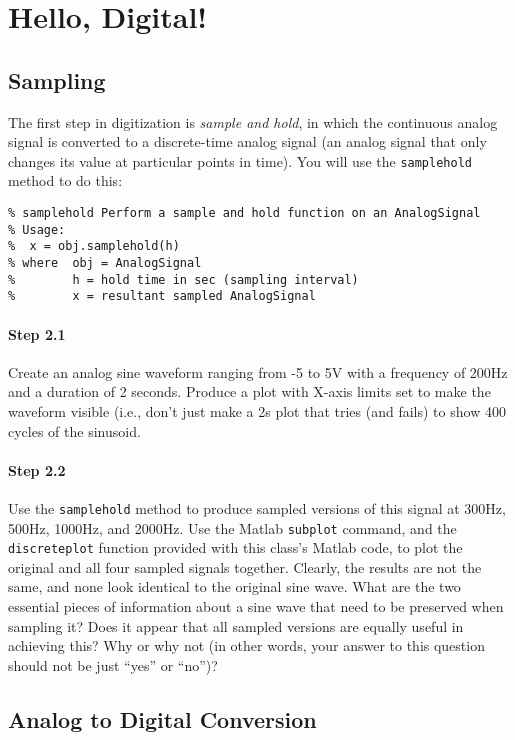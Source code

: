 
\section{Hello, Digital!}


\subsection{Sampling}

The first step in digitization is \emph{sample and hold}, in which the
continuous analog signal is converted to a discrete-time analog signal
(an analog signal that only changes its value at particular points in
time). You will use the \texttt{samplehold} method to do this:
\begin{verbatim}
% samplehold Perform a sample and hold function on an AnalogSignal
% Usage:
%  x = obj.samplehold(h)
% where  obj = AnalogSignal
%        h = hold time in sec (sampling interval)
%        x = resultant sampled AnalogSignal
\end{verbatim}

\paragraph{Step 2.1} Create an analog sine waveform ranging from -5 to
5V with a frequency of 200Hz and a duration of 2 seconds. Produce a
plot with X-axis limits set to make the waveform visible (i.e., don't
just make a 2s plot that tries (and fails) to show 400 cycles of the
sinusoid.

\paragraph{Step 2.2} Use the \texttt{samplehold} method to produce
sampled versions of this signal at 300Hz, 500Hz, 1000Hz, and
2000Hz. Use the Matlab \texttt{subplot} command, and the
\texttt{discreteplot} function provided with this class's Matlab code,
to plot the original and all four sampled signals together. Clearly,
the results are not the same, and none look identical to the original
sine wave. What are the two essential pieces of information about a
sine wave that need to be preserved when sampling it? Does it appear
that all sampled versions are equally useful in achieving this? Why or
why not (in other words, your answer to this question should not be
just ``yes'' or ``no'')?


\subsection{Analog to Digital Conversion}

